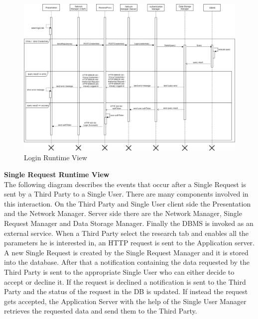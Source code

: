 \documentclass[titlepage]{article}
\begin{document}
\begin{figure}[H]
	\center
  	\includegraphics[width=15cm]{Login.png}
  	\caption{Login Runtime View}
 	\label{fig:LOG}
\end{figure}

{\bf Single Request Runtime View }\\ 
The following diagram describes the events that occur after a Single Request is sent by a Third Party to a Single User. There are many components involved in this interaction. On the Third Party and Single User client side the Presentation and the Network Manager. Server side there are the Network Manager, Single Request Manager and Data Storage Manager. Finally the DBMS is invoked as an external service.
When a Third Party select the research tab and enables all the parameters he is interested in, an HTTP request is sent to the Application server. A new Single Request is created by the Single Request Manager and it is stored into the database. After that a notification containing the data requested by the Third Party is sent to the appropriate Single User who can either decide to accept or decline it. If the request is declined a notification is sent to the Third Party and the status of the request in the DB is updated. If instead the request gets accepted, the Application Server with the help of the Single User Manager retrieves the requested data and send them to the Third Party.
\end{document}
